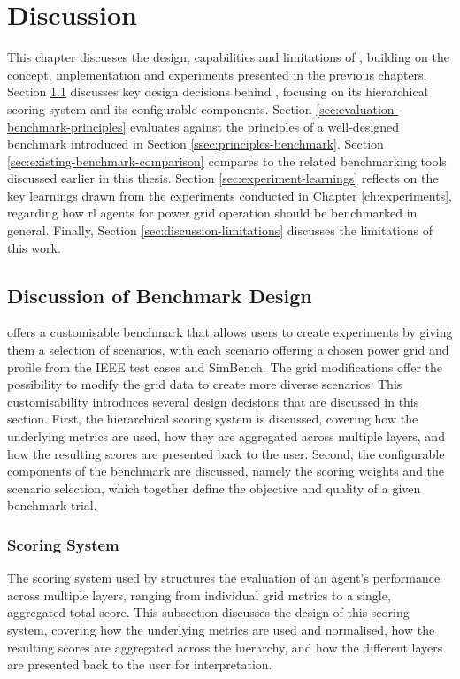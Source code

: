 \chapter{Discussion}\label{ch:discussion}
This chapter discusses the design, capabilities and limitations of \benchmark, building on the concept, implementation and experiments presented in the previous chapters. Section \ref{sec:discussion-benchmark-design} discusses key design decisions behind \benchmark, focusing on its hierarchical scoring system and its configurable components. Section \ref{sec:evaluation-benchmark-principles} evaluates \benchmark against the principles of a well-designed benchmark introduced in Section \ref{ssec:principles-benchmark}. Section \ref{sec:existing-benchmark-comparison} compares \benchmark to the related benchmarking tools discussed earlier in this thesis. Section \ref{sec:experiment-learnings} reflects on the key learnings drawn from the experiments conducted in Chapter \ref{ch:experiments}, regarding how \ac{rl} agents for power grid operation should be benchmarked in general. Finally, Section \ref{sec:discussion-limitations} discusses the limitations of this work.




\section{Discussion of Benchmark Design}\label{sec:discussion-benchmark-design}
\benchmark offers a customisable benchmark that allows users to create experiments by giving them a selection of scenarios, with each scenario offering a chosen power grid and profile from the IEEE test cases and SimBench. The grid modifications offer the possibility to modify the grid data to create more diverse scenarios. This customisability introduces several design decisions that are discussed in this section. First, the hierarchical scoring system is discussed, covering how the underlying metrics are used, how they are aggregated across multiple layers, and how the resulting scores are presented back to the user. Second, the configurable components of the benchmark are discussed, namely the scoring weights and the scenario selection, which together define the objective and quality of a given benchmark trial.

\subsection{Scoring System}
The scoring system used by \benchmark structures the evaluation of an agent's performance across multiple layers, ranging from individual grid metrics to a single, aggregated total score. This subsection discusses the design of this scoring system, covering how the underlying metrics are used and normalised, how the resulting scores are aggregated across the hierarchy, and how the different layers are presented back to the user for interpretation.

